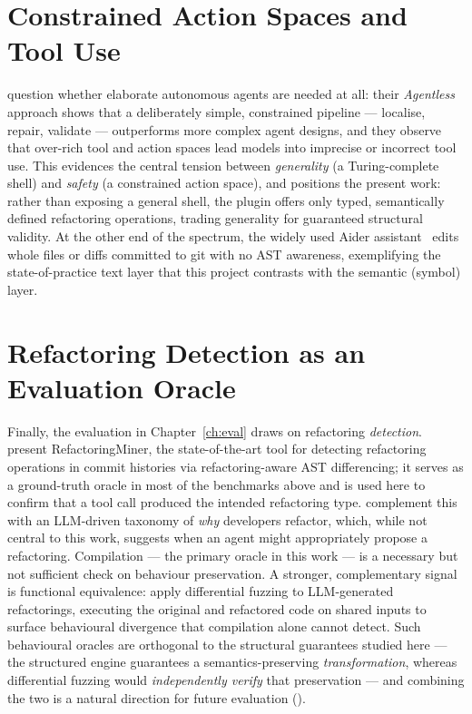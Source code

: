\section{Constrained Action Spaces and Tool Use}
\label{sec:bg-action-space}

\citet{demystifying2025} question whether elaborate autonomous agents are needed at
all: their \emph{Agentless} approach shows that a deliberately simple, constrained
pipeline --- localise, repair, validate --- outperforms more complex agent designs,
and they observe that over-rich tool and action spaces lead models into imprecise or
incorrect tool use. This evidences the central tension between \emph{generality} (a
Turing-complete shell) and \emph{safety} (a constrained action space), and positions
the present work: rather than exposing a general shell, the plugin offers only typed,
semantically defined refactoring operations, trading generality for guaranteed
structural validity. At the other end of the spectrum, the widely used Aider
assistant~\citep{aider} edits whole files or diffs committed to git with no AST
awareness, exemplifying the state-of-practice text layer that this project
contrasts with the semantic (symbol) layer.

\section{Refactoring Detection as an Evaluation Oracle}
\label{sec:bg-detection}

Finally, the evaluation in Chapter~\ref{ch:eval} draws on refactoring
\emph{detection}. \citet{refactoringminer2025} present RefactoringMiner, the
state-of-the-art tool for detecting refactoring operations in commit histories
via refactoring-aware AST differencing; it serves as a ground-truth oracle in
most of the benchmarks above and is used here to confirm that a tool call
produced the intended refactoring type. \citet{motivations2025} complement this
with an LLM-driven taxonomy of \emph{why} developers refactor, which, while not
central to this work, suggests when an agent might appropriately propose a
refactoring. Compilation --- the primary oracle in this work --- is a necessary
but not sufficient check on behaviour preservation. A stronger, complementary
signal is functional equivalence: \citet{difffuzzing2026} apply differential
fuzzing to LLM-generated refactorings, executing the original and refactored code
on shared inputs to surface behavioural divergence that compilation alone cannot
detect. Such behavioural oracles are orthogonal to the structural guarantees
studied here --- the structured engine guarantees a semantics-preserving
\emph{transformation}, whereas differential fuzzing would \emph{independently
verify} that preservation --- and combining the two is a natural direction for
future evaluation ().

